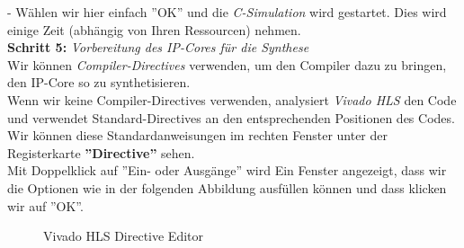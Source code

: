 \documentclass[a4paper]{report}
\begin{document}
- Wählen wir hier einfach ''OK'' und die \textit{C-Simulation} wird gestartet. Dies wird einige Zeit (abhängig von Ihren Ressourcen) nehmen.\\

\textbf{Schritt 5:} \textit{Vorbereitung des IP-Cores für die Synthese}\\

Wir können \textit{Compiler-Directives} verwenden, um den Compiler dazu zu bringen, den IP-Core so zu synthetisieren.\\

Wenn wir keine Compiler-Directives verwenden, analysiert \textit{Vivado HLS} den Code und verwendet Standard-Directives an den entsprechenden Positionen des Codes. Wir können diese Standardanweisungen im rechten Fenster unter der Registerkarte  \textbf{''Directive''} sehen.\\

Mit Doppelklick auf ''Ein- oder Ausgänge'' wird Ein Fenster angezeigt, dass wir die Optionen wie in der folgenden Abbildung ausfüllen können und dass klicken wir auf ''OK''.\\


\begin{figure}[H]
\centering
{}
\caption{Vivado HLS Directive Editor}
\label{fig:Vivado_HLS_Directive_Editor}
\end{figure}
\end{document}
